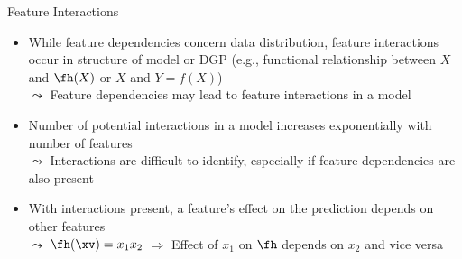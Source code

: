 \documentclass[11pt,compress,t,notes=noshow, aspectratio=169, xcolor=table]{beamer}
\begin{document}
\begin{frame}{Feature Interactions}
\begin{itemize}
\item While feature dependencies concern data distribution, feature interactions occur in structure of model or DGP (e.g., functional relationship between $X$ and $\fh(X)$ or $X$ and $Y = f(X)$)\\
$\leadsto$ Feature dependencies may lead to feature interactions in a model
\pause
\item Number of potential interactions in a model increases exponentially with number of features \\
$\leadsto$ Interactions are difficult to identify, especially if feature dependencies are also present
\pause
\item With interactions present, a feature's effect on the prediction depends on other features\\
$\leadsto$
$\fh(\xv) = x_1 x_2$ $\Rightarrow$ Effect of $x_1$ on $\fh$ depends on $x_2$ and vice versa

\begin{columns}[T, totalwidth=\textwidth]
\begin{column}{0.5\textwidth}
\centering
{}
\end{column}
\end{columns}
\end{itemize}
\end{frame}
\end{document}
